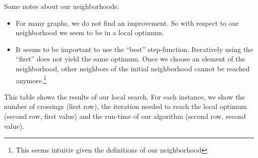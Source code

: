 \documentclass{scrartcl}
\begin{document}





Some notes about our neighborhoods:

\begin{itemize}
  \item For many graphs, we do not find an improvement. So with respect to our neighborhood we
  seem to be in a local optimum. 
  \item It seems to be important to use the ``best''
    step-function. Iteratively using the ``first'' does not yield the
    same optimum. Once we choose an element of the neighborhood, other
    neighbors of the initial neighborhood cannot be reached
    anymore.\footnote{This seems intuitiv given the definitions of our
      neighborhood}
\end{itemize}






\begin{landscape}
\begin{table}
  \scriptsize
  
\caption{This table shows the results of our local search. For each instance, we show the number of crossings (first row), the iteration 
needed to reach the local optimum (second row, first value) and the run-time of our algorithm (second row, second value).}
\label{tab:results}
\end{table}
\end{landscape}
\end{document}
